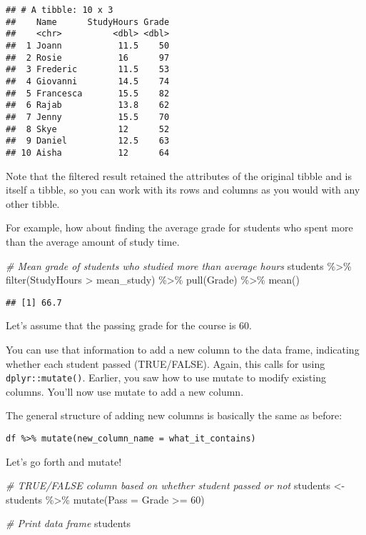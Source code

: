 \documentclass[
]{article}
\newenvironment{Shaded}{\begin{snugshade}}{\end{snugshade}}
\newcommand{\AttributeTok}[1]{\textcolor[rgb]{0.77,0.63,0.00}{#1}}
\newcommand{\CommentTok}[1]{\textcolor[rgb]{0.56,0.35,0.01}{\textit{#1}}}
\newcommand{\DecValTok}[1]{\textcolor[rgb]{0.00,0.00,0.81}{#1}}
\newcommand{\FunctionTok}[1]{\textcolor[rgb]{0.00,0.00,0.00}{#1}}
\newcommand{\NormalTok}[1]{#1}
\newcommand{\OtherTok}[1]{\textcolor[rgb]{0.56,0.35,0.01}{#1}}
\newcommand{\SpecialCharTok}[1]{\textcolor[rgb]{0.00,0.00,0.00}{#1}}
\begin{document}
\begin{verbatim}
## # A tibble: 10 x 3
##    Name      StudyHours Grade
##    <chr>          <dbl> <dbl>
##  1 Joann           11.5    50
##  2 Rosie           16      97
##  3 Frederic        11.5    53
##  4 Giovanni        14.5    74
##  5 Francesca       15.5    82
##  6 Rajab           13.8    62
##  7 Jenny           15.5    70
##  8 Skye            12      52
##  9 Daniel          12.5    63
## 10 Aisha           12      64
\end{verbatim}

Note that the filtered result retained the attributes of the original
tibble and is itself a tibble, so you can work with its rows and columns
as you would with any other tibble.

For example, how about finding the average grade for students who spent
more than the average amount of study time.

\begin{Shaded}
\begin{Highlighting}[]
\CommentTok{\# Mean grade of students who studied more than average hours}
\NormalTok{students }\SpecialCharTok{\%\textgreater{}\%} 
  \FunctionTok{filter}\NormalTok{(StudyHours }\SpecialCharTok{\textgreater{}}\NormalTok{ mean\_study) }\SpecialCharTok{\%\textgreater{}\%} 
  \FunctionTok{pull}\NormalTok{(Grade) }\SpecialCharTok{\%\textgreater{}\%} 
  \FunctionTok{mean}\NormalTok{()}
\end{Highlighting}
\end{Shaded}

\begin{verbatim}
## [1] 66.7
\end{verbatim}

Let's assume that the passing grade for the course is 60.

You can use that information to add a new column to the data frame,
indicating whether each student passed (TRUE/FALSE). Again, this calls
for using \texttt{dplyr::mutate()}. Earlier, you saw how to use mutate
to modify existing columns. You'll now use mutate to add a new column.

The general structure of adding new columns is basically the same as
before:

\texttt{df\ \%\textgreater{}\%\ mutate(new\_column\_name\ =\ what\_it\_contains)}

Let's go forth and mutate!

\begin{Shaded}
\begin{Highlighting}[]
\CommentTok{\# TRUE/FALSE column based on whether student passed or not}
\NormalTok{students }\OtherTok{\textless{}{-}}\NormalTok{ students }\SpecialCharTok{\%\textgreater{}\%} 
                  \FunctionTok{mutate}\NormalTok{(}\AttributeTok{Pass =}\NormalTok{ Grade }\SpecialCharTok{\textgreater{}=} \DecValTok{60}\NormalTok{)}

\CommentTok{\# Print data frame}
\NormalTok{students}
\end{Highlighting}
\end{Shaded}
\end{document}
